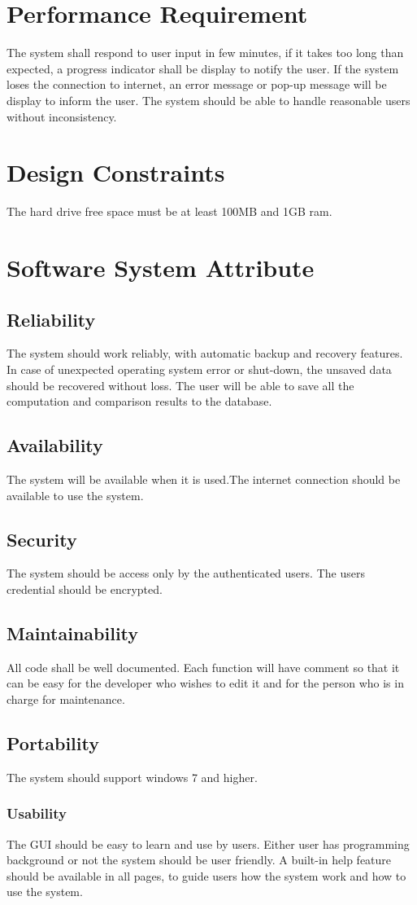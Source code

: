 
\author{Rebecca Mabaso}

\section{Performance Requirement}
The system shall respond to user input in few minutes, if it takes too long than expected, a progress indicator shall be display to notify the user.
If the system loses the connection to internet, an error message or pop-up message will be display to inform the user.
The system should be able to handle reasonable users without inconsistency.
\section{Design Constraints}
The hard drive free space must be at least 100MB and 1GB ram.
\section{Software System Attribute}
\subsection{Reliability }
The system should work reliably, with automatic backup and recovery features. In case of unexpected operating system error or shut-down, the unsaved data should be recovered without loss. The user will be able to save all the computation and comparison results to the database.
\subsection{Availability}
The system will be available when it is used.The internet connection should be available to use the system.
\subsection{ Security }
The system should be access only by the authenticated users. The users credential should be encrypted.\subsection{Maintainability}
All code shall be well documented. Each function will have comment so that it can be easy for the developer who wishes to edit it and for the person who is in charge for maintenance.
\subsection{Portability }
The system should support windows 7 and higher.
\subsubsection{ Usability}
 The GUI should be easy to learn and use by users. Either user has programming background or not the system should be user friendly. A built-in help feature should be available in all pages, to guide users how the system work and how to use the system.
 
